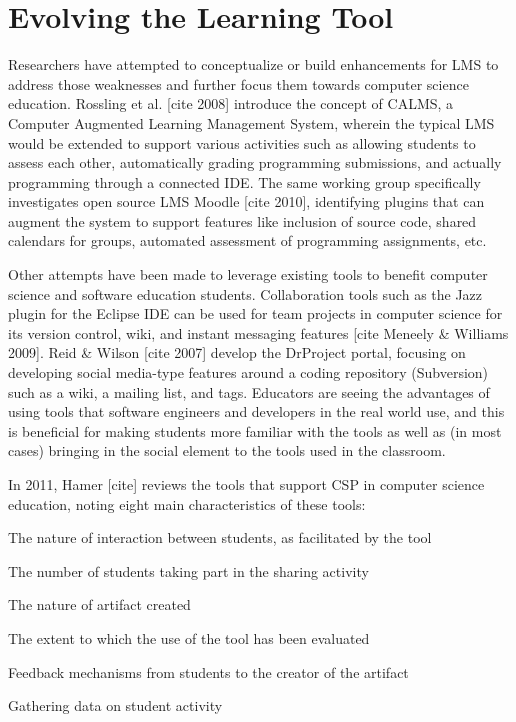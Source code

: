 \section{Evolving the Learning Tool}

Researchers have attempted to conceptualize or build enhancements for LMS to address those weaknesses and further focus them towards computer science education. Rossling et al. [cite 2008] introduce the concept of CALMS, a Computer Augmented Learning Management System, wherein the typical LMS would be extended to support various activities such as allowing students to assess each other, automatically grading programming submissions, and actually programming through a connected IDE. The same working group specifically investigates open source LMS Moodle [cite 2010], identifying plugins that can augment the system to support features like inclusion of source code, shared calendars for groups, automated assessment of programming assignments, etc.

Other attempts have been made to leverage existing tools to benefit computer science and software education students. Collaboration tools such as the Jazz plugin for the Eclipse IDE can be used for team projects in computer science for its version control, wiki, and instant messaging features [cite Meneely & Williams 2009]. Reid & Wilson [cite 2007] develop the DrProject portal, focusing on developing social media-type features around a coding repository (Subversion) such as a wiki, a mailing list, and tags. Educators are seeing the advantages of using tools that software engineers and developers in the real world use, and this is beneficial for making students more familiar with the tools as well as (in most cases) bringing in the social element to the tools used in the classroom.

In 2011, Hamer [cite] reviews the tools that support CSP in computer science education, noting eight main characteristics of these tools:

The nature of interaction between students, as facilitated by the tool

The number of students taking part in the sharing activity

The nature of artifact created

The extent to which the use of the tool has been evaluated

Feedback mechanisms from students to the creator of the artifact

Gathering data on student activity

